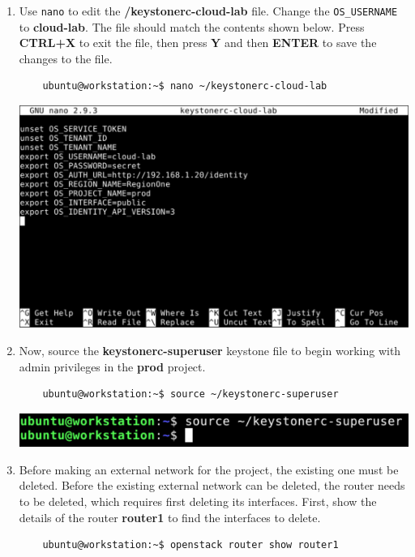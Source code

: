 \documentclass[letterpaper, 12pt]{article}
\begin{document}
\begin{enumerate}
    \item Use \texttt{nano} to edit the \textbf{\texttildemid/keystonerc-cloud-lab} file. Change the
    \texttt{OS\_USERNAME} to \textbf{cloud-lab}. The file should match the contents shown below. Press \textbf{CTRL+X}
    to exit the file, then press \textbf{Y} and then \textbf{ENTER} to save the changes to the file.
    \begin{lstlisting}
    ubuntu@workstation:~$ nano ~/keystonerc-cloud-lab
    \end{lstlisting}

    \begin{center}
        \includegraphics[width=\linewidth]{images/part1/step12.png}
    \end{center}

    \item Now, source the \textbf{keystonerc-superuser} keystone file to begin working with admin privileges in the
    \textbf{prod} project.
    \begin{lstlisting}
    ubuntu@workstation:~$ source ~/keystonerc-superuser
    \end{lstlisting}

    \begin{center}
        \includegraphics[width=\linewidth]{images/part1/step13.png}
    \end{center}

    \item Before making an external network for the project, the existing one must be deleted. Before the existing
    external network can be deleted, the router needs to be deleted, which requires first deleting its interfaces.
    First, show the details of the router \textbf{router1} to find the interfaces to delete.
    \begin{lstlisting}
    ubuntu@workstation:~$ openstack router show router1
    \end{lstlisting}


\end{enumerate}
\end{document}

